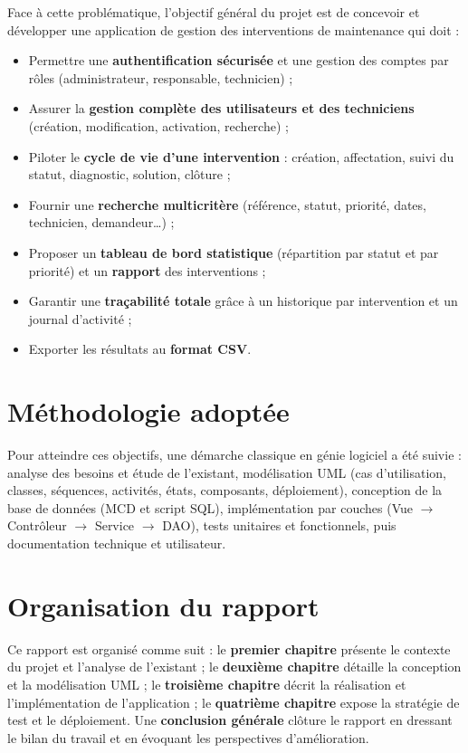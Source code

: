 \documentclass[11pt,a4paper]{report}
\begin{document}
Face à cette problématique, l'objectif général du projet est de concevoir et développer une application de gestion des interventions de maintenance qui doit :
\begin{itemize}
  \item Permettre une \textbf{authentification sécurisée} et une gestion des comptes par rôles (administrateur, responsable, technicien) ;
  \item Assurer la \textbf{gestion complète des utilisateurs et des techniciens} (création, modification, activation, recherche) ;
  \item Piloter le \textbf{cycle de vie d'une intervention} : création, affectation, suivi du statut, diagnostic, solution, clôture ;
  \item Fournir une \textbf{recherche multicritère} (référence, statut, priorité, dates, technicien, demandeur…) ;
  \item Proposer un \textbf{tableau de bord statistique} (répartition par statut et par priorité) et un \textbf{rapport} des interventions ;
  \item Garantir une \textbf{traçabilité totale} grâce à un historique par intervention et un journal d'activité ;
  \item Exporter les résultats au \textbf{format CSV}.
\end{itemize}
\section*{Méthodologie adoptée}

Pour atteindre ces objectifs, une démarche classique en génie logiciel a été suivie : analyse des besoins et étude de l'existant, modélisation UML (cas d'utilisation, classes, séquences, activités, états, composants, déploiement), conception de la base de données (MCD et script SQL), implémentation par couches (Vue $\rightarrow$ Contrôleur $\rightarrow$ Service $\rightarrow$ DAO), tests unitaires et fonctionnels, puis documentation technique et utilisateur.
\section*{Organisation du rapport}

Ce rapport est organisé comme suit : le \textbf{premier chapitre} présente le contexte du projet et l'analyse de l'existant ; le \textbf{deuxième chapitre} détaille la conception et la modélisation UML ; le \textbf{troisième chapitre} décrit la réalisation et l'implémentation de l'application ; le \textbf{quatrième chapitre} expose la stratégie de test et le déploiement. Une \textbf{conclusion générale} clôture le rapport en dressant le bilan du travail et en évoquant les perspectives d'amélioration.
\end{document}
